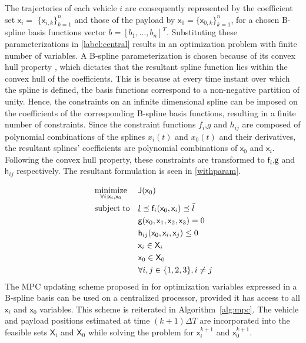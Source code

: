\documentclass[letterpaper, 10 pt, conference]{ieeeconf}
\newcommand{\ubar}[1]{\text{\b{$#1$}}}
\DeclareMathOperator*{\minimize}{minimize}
\DeclareMathOperator*{\subj}{subject\;to}
\newcommand{\cx}{\textsf{x}}
\newcommand{\J}{\textsf{J}}
\newcommand{\cf}{\textsf{f}}
\newcommand{\cg}{\textsf{g}}
\newcommand{\ch}{\textsf{h}}
\newcommand{\X}{\textsf{X}}
\begin{document}
 The trajectories of each vehicle $i$ are consequently represented by the coefficient set $\cx_i$$=$ $\{\cx_{i,k}\}_{k=1}^{n}$ and those of the payload by $\cx_0$$=$$\{\cx_{0,k}\}_{k=1}^{n}$, for a chosen B-spline basis functions vector $b = [b_1,\ldots,b_n]^T$. Substituting these parameterizations in \eqref{label:central} results in an optimization problem with finite number of variables. A B-spline parameterization is chosen because of its convex hull property \cite{c15}, which dictates that the resultant spline function lies within the convex hull of the coefficients. This is because at every time instant over which the spline is defined, the basis functions correspond to a non-negative partition of unity. Hence, the constraints on an infinite dimensional spline can be imposed on the coefficients of the corresponding B-spline basis functions, resulting in a finite number of constraints. Since the constraint functions $f_i$,$g$ and $h_{ij}$ are composed of polynomial combinations of the splines $x_i(t)$ and $x_0(t)$ and their derivatives, the resultant splines' coefficients are polynomial combinations of $\cx_0$ and $\cx_i$. Following the convex hull property, these constraints are transformed to $\cf_i$,$\cg$ and $\ch_{ij}$ respectively.
The resultant formulation is seen in \eqref{withparam}.

 \begin{equation}
   \label{withparam}
   \begin{aligned}
     & \minimize_{\forall i:\cx_i,\cx_0} &&  \J(\cx_0) \\
     & \subj
     && \ubar{l} \preceq \cf_i(\cx_0,\cx_i) \preceq \bar{l}\\
     &       && \cg(\cx_0,\cx_1,\cx_2,\cx_3) = 0 \\
     &		&& \ch_{ij}(\cx_0,\cx_i,\cx_j) \leq 0 \\
     &		&& \cx_i \in \X_i \\
     &		&& \cx_0 \in \X_0 \\
     &                                && \forall i,j \in \{1,2,3\}, i \neq j
   \end{aligned}
 \end{equation}
 The MPC updating scheme proposed in \cite{c16} for optimization variables expressed in a B-spline basis can be used on a centralized processor, provided it has access to all $\cx_i$ and $\cx_0$ variables. This scheme is reiterated in Algorithm~\ref{alg:mpc}. The vehicle and payload positions estimated at time $(k+1)\Delta T$ are incorporated into the feasible sets $\X_i$ and $\X_0$ while solving the problem for $\cx_i^{k+1}$ and $\cx_0^{k+1}$.
\end{document}
